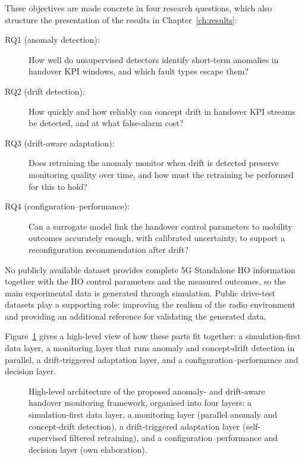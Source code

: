 These objectives are made concrete in four research questions, which also
structure the presentation of the results in Chapter~\ref{ch:results}:
\begin{description}
  \item[RQ1 (anomaly detection):] How well do unsupervised detectors identify
  short-term anomalies in handover KPI windows, and which fault types escape
  them?
  \item[RQ2 (drift detection):] How quickly and how reliably can concept drift
  in handover KPI streams be detected, and at what false-alarm cost?
  \item[RQ3 (drift-aware adaptation):] Does retraining the anomaly monitor when
  drift is detected preserve monitoring quality over time, and how must the
  retraining be performed for this to hold?
  \item[RQ4 (configuration--performance):] Can a surrogate model link the
  handover control parameters to mobility outcomes accurately enough, with
  calibrated uncertainty, to support a reconfiguration recommendation after
  drift?
\end{description}

No publicly available dataset provides complete 5G Standalone HO information together with the HO control parameters and the measured outcomes, so the main experimental data is generated through simulation. Public drive-test datasets play a supporting role: improving the realism of the radio environment and providing an additional reference for validating the generated data.

Figure~\ref{fig:framework-overview} gives a high-level view of how these
parts fit together: a simulation-first data layer, a monitoring layer that
runs anomaly and concept-drift detection in parallel, a drift-triggered
adaptation layer, and a configuration--performance and decision layer.

\begin{figure}[htbp]
\centering
{}
\caption[High-level architecture of the proposed framework]{High-level
architecture of the proposed anomaly- and drift-aware handover monitoring
framework, organised into four layers: a simulation-first data layer, a
monitoring layer (parallel anomaly and concept-drift detection), a
drift-triggered adaptation layer (self-supervised filtered retraining), and a
configuration--performance and decision layer (own elaboration).}
\label{fig:framework-overview}
\end{figure}

